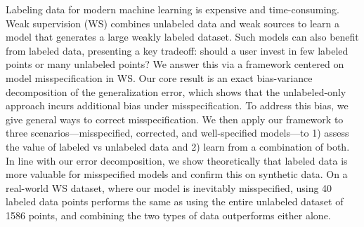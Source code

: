 Labeling data for modern machine learning is expensive and time-consuming. Weak supervision (WS) combines unlabeled data and weak sources to learn a model that generates a large weakly labeled dataset. Such models can also benefit from labeled data, presenting a key tradeoff: should a user invest in few labeled points or many unlabeled points? 
We answer this via a framework centered on model misspecification in WS. Our core result is an exact bias-variance decomposition of the generalization error, which shows that the unlabeled-only approach incurs additional bias under misspecification.
To address this bias, we give general ways to correct misspecification. We then apply our framework to three scenarios---misspecified, corrected, and well-specified models---to 1) assess the value of labeled vs unlabeled data and 2) learn from a combination of both. In line with our error decomposition, we show theoretically that labeled data is more valuable for misspecified models and confirm this on synthetic data.
On a real-world WS dataset, where our model is inevitably misspecified, using 40 labeled data points performs the same as using the entire unlabeled dataset of 1586 points, and combining the two types of data outperforms either alone.


 
%
%

